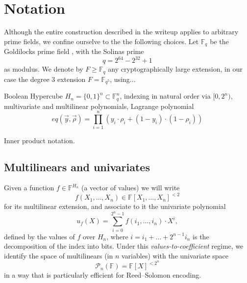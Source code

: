 \section{Notation \tbc}

Although the entire construction described in the writeup applies to arbitrary prime fields, we confine ourselve to the the following choices.
%
Let $\mathbb F_q$ be the Goldilocks prime field \cite{}, with the Solinas prime
\[
q = 2^{64} - 2^{32} + 1
\]
as modulus. 
We denote by $F\geq \mathbb F_q$ any cryptographically large extension, in our case the degree 3 extension $F = \mathbb F_{q^5}$, using...


Boolean Hypercube $H_n = \{0,1\}^n\subset \mathbb F_q^n$, indexing in natural order via $[0,2^n)$, 
multivariate and multilinear polynomials,
Lagrange polynomial
\begin{equation}
\label{e:eq}
eq(\vec y, \vec\rho) = \prod_{i=1}^n (y_i \cdot \rho_i + (1 - y_i)\cdot (1-\rho_i))
\end{equation}

Inner product notation.


\subsection{Multilinears and  univariates}

 
Given a function $f\in \mathbb F^{H_n}$ (a vector of values) we will write
\[
f(X_1,\ldots, X_n) \in \mathbb F[X_1,\ldots, X_n]^{<2}
\]
for its multilinear extension, and 
associate to it the univariate polynomial
\begin{equation}
\label{e:values:to:coeffs}
u_f(X) = \sum_{i=0}^{2^n-1} f(i_1,\ldots, i_n) \cdot X^i,
\end{equation}
defined by the values of $f$ over $H_n$,  where $i = i_1 + \ldots + 2^{n-1} i_n$ is the decomposition of the index into bits. 
Under this \textit{values-to-coefficient} regime, we identify the space of multilinears (in $n$ variables) with the univariate space
\begin{equation}
\mathscr P_{n}(\mathbb F) = \mathbb F[X]^{<2^n} 
\end{equation}
in a way that is particularly efficient for Reed--Solomon encoding. 

